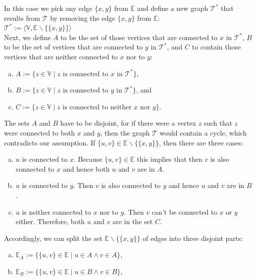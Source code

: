 \begin{enumerate}
  In this case we pick any edge $\{x,y\}$ from $\mathbb{E}$ and define a new graph $\mathcal{T}^*$ that results from $\mathcal{T}$
  by removing the edge $\{x,y\}$ from $\mathbb{E}$:
  \\[0.2cm]
  \hspace*{1.3cm}
  $\mathcal{T}^* := \bigl\langle \mathbb{V}, \mathbb{E} \backslash \bigl\{ \{x,y\} \bigr\} \bigr\rangle$ 
  \\[0.2cm]
  Next, we define $A$ to be the set of those vertices that are connected to $x$ in $\mathcal{T}^*$, $B$ to be the set
  of vertices that are connected to $y$ in $\mathcal{T}^*$, and $C$ to contain those vertices that are neither connected to
  $x$ nor to $y$:
  \begin{enumerate}[(a)]
  \item $A := \{ z \in \mathbb{V} \mid \mbox{$z$ is connected to $x$ in $\mathcal{T}^*$}\}$, \quad 
  \item $B := \{ z \in \mathbb{V} \mid \mbox{$z$ is connected to $y$ in $\mathcal{T}^*$}\}$, \quad and \quad
  \item $C := \{ z \in \mathbb{V} \mid \mbox{$z$ is connected to neither $x$ nor $y$}\}$.
  \end{enumerate}
  The sets $A$ and $B$ have to be disjoint, for if there were a vertex $z$ such that $z$ were connected to both
  $x$ and $y$, then the graph $\mathcal{T}$ would contain a cycle, which contradicts our assumption.
  If $\{u,v\}\in\mathbb{E} \backslash \bigl\{ \{x,y\} \bigr\}$, then there are three cases:
  \begin{enumerate}[(a)]
  \item $u$ is connected to $x$.  Because $\{u,v\}\in\mathbb{E}$ this implies that then $v$ is also connected
        to $x$ and hence both $u$ and $v$ are in $A$.
  \item $u$ is connected to $y$.  Then $v$ is also connected to $y$ and hence $u$ and $v$ are in $B$.
  \item $u$ is neither connected to $x$ nor to $y$.  Then $v$ can't be connected to $x$ or $y$ either.
        Therefore, both $u$ and $v$ are in the set $C$.
  \end{enumerate}
  Accordingly, we can split the set $\mathbb{E} \backslash \bigl\{ \{x,y\} \bigr\}$ of edges into three disjoint parts:
  \begin{enumerate}[(a)]
  \item $\mathbb{E}_A := \bigl\{ \{u,v\}\in\mathbb{E} \mid u\in A \wedge v\in A \bigr\}$,
  \item $\mathbb{E}_B := \bigl\{ \{u,v\}\in\mathbb{E} \mid u\in B \wedge v\in B \bigr\}$,

\end{enumerate}
\end{enumerate}
